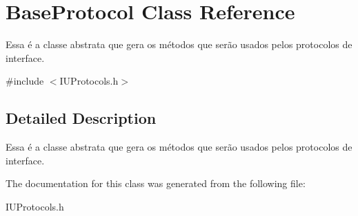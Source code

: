 \hypertarget{class_base_protocol}{\section{Base\-Protocol Class Reference}
\label{class_base_protocol}
}


Essa é a classe abstrata que gera os métodos que serão usados pelos protocolos de interface.  




{\ttfamily \#include $<$I\-U\-Protocols.\-h$>$}



\subsection{Detailed Description}
Essa é a classe abstrata que gera os métodos que serão usados pelos protocolos de interface. 

The documentation for this class was generated from the following file\-:\begin{DoxyCompactItemize}
\item 
I\-U\-Protocols.\-h\end{DoxyCompactItemize}
